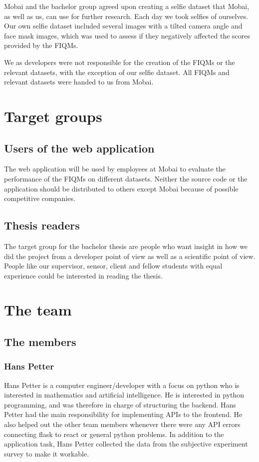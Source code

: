 Mobai and the bachelor group agreed upon creating a selfie dataset that Mobai, as well as us, can use for further research. Each day we took selfies of ourselves. Our own selfie dataset included several images with a tilted camera angle and face mask images, which was used to assess if they negatively affected the scores provided by the FIQMs. 

We as developers were not responsible for the creation of the FIQMs or the relevant datasets, with the exception of our selfie dataset. All FIQMs and relevant datasets were handed to us from Mobai.

\section{Target groups}
\subsection{Users of the web application}
The web application will be used by employees at Mobai to evaluate the performance of the FIQMs on different datasets. Neither the source code or the application should be distributed to others except Mobai because of possible competitive companies.

\subsection{Thesis readers}
The target group for the bachelor thesis are people who want insight in how we did the project from a developer point of view as well as a scientific point of view. People like our supervisor, sensor, client and fellow students with equal experience could be interested in reading the thesis.

\section{The team}

\subsection{The members}

\subsubsection*{Hans Petter}
Hans Petter is a computer engineer/developer with a focus on python who is interested in mathematics and artificial intelligence. He is interested in python programming, and was therefore in charge of structuring the backend. Hans Petter had the main responsibility for implementing APIs to the frontend. He also helped out the other team members whenever there were any API errors connecting flask to react or general python problems. In addition to the application task, Hans Petter collected the data from the subjective experiment survey to make it workable. 

